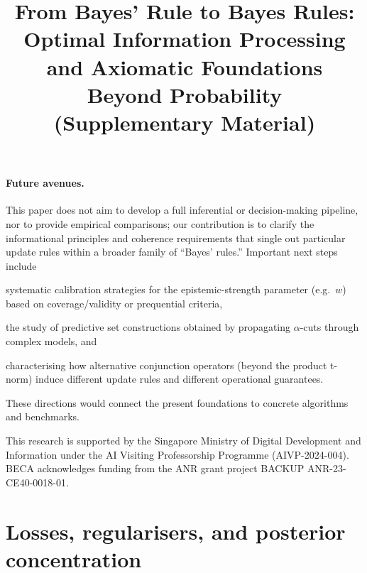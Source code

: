 \documentclass[accepted]{uai2026} %
\theoremstyle{remark}
\begin{document}
\paragraph{Future avenues.} This paper does not aim to develop a full inferential or decision-making pipeline, nor to provide empirical comparisons; our contribution is to clarify the informational principles and coherence requirements that single out particular update rules within a broader family of ``Bayes' rules.'' Important next steps include
\begin{enumerate*}[label=\roman*)]
\item systematic calibration strategies for the epistemic-strength parameter (e.g.\ $w$) based on coverage/validity or prequential criteria,
\item the study of predictive set constructions obtained by propagating $\alpha$-cuts through complex models, and
\item characterising how alternative conjunction operators (beyond the product t-norm) induce different update rules and different operational guarantees.
\end{enumerate*}
These directions would connect the present foundations to concrete algorithms and benchmarks.


\begin{acknowledgements} 
This research is supported by the Singapore Ministry of Digital Development and Information under the AI Visiting Professorship Programme (AIVP-2024-004).
BECA acknowledges funding from the ANR grant project BACKUP ANR-23-CE40-0018-01.
\end{acknowledgements}



\newpage

\onecolumn

\title{From Bayes' Rule to Bayes Rules: \\
Optimal Information Processing and Axiomatic Foundations Beyond Probability \\(Supplementary Material)}
\maketitle

\appendix

\section{Losses, regularisers, and posterior concentration}
\label{app:losses-regularisers}
\end{document}
